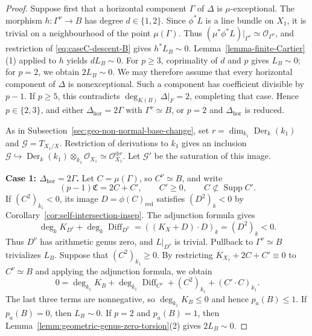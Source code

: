 \documentclass[10pt,abstract=true]{scrartcl}
\numberwithin{equation}{section}
\theoremstyle{definition}
\theoremstyle{remark}
\DeclareMathOperator\Supp{Supp}
\begin{document}
\begin{proof}
  Suppose first that a horizontal component $\Gamma$ of $\Delta$ is $\mu$-exceptional.
  The morphism $h\colon\Gamma^\nu\to B$ has degree $d\in\{1,2\}$.
  Since $\phi^*L$ is a line bundle on $X_1$, it is trivial on a neighbourhood of the point $\mu(\Gamma)$.
  Thus $(\mu^*\phi^*L)|_{\Gamma^\nu}\simeq\mathcal O_{\Gamma^\nu}$, and restriction of \eqref{eq:caseC-descent-B} gives $h^*L_B\sim0$.
  Lemma~\ref{lemma-finite-Cartier}\,\textup{(1)} applied to $h$ yields $dL_B\sim0$.
  For $p\geq3$, coprimality of $d$ and $p$ gives $L_B\sim0$; for $p=2$, we obtain $2L_B\sim0$.
  We may therefore assume that every horizontal component of $\Delta$ is nonexceptional.
  Such a component has coefficient divisible by $p-1$.
  If $p\geq5$, this contradicts $\deg_{K(B)}\Delta|_F=2$, completing that case.
  Hence $p\in\{2,3\}$, and either $\Delta_{\mathrm{hor}}=2\Gamma$ with $\Gamma^\nu\simeq B$, or $p=2$ and $\Delta_{\mathrm{hor}}$ is reduced.

  \smallskip
  As in Subsection~\ref{sec:geo-non-normal-base-change}, set $r=\dim_{k_1}\operatorname{Der}_k(k_1)$ and $\mathscr G=T_{X_1/X}$.
  Restriction of derivations to $k_1$ gives an inclusion $\mathscr G\hookrightarrow\operatorname{Der}_k(k_1)\otimes_{k_1}\mathcal O_{X_1} \simeq\mathcal O_{X_1}^{\oplus r}$.
  Let $\mathscr G'$ be the saturation of this image.

  \par\smallskip
  \noindent\textbf{Case 1: $\Delta_{\mathrm{hor}}=2\Gamma$.}
  Let $C=\mu(\Gamma)$, so $C^\nu\simeq B$, and write
  \[
    (p-1)\mathfrak C=2C+C',\qquad
    C'\geq0,\qquad C\not\subset\Supp C'.
  \]
  If $(C^2)_{k_1}<0$, its image $D=\phi(C)_{\mathrm{red}}$ satisfies $(D^2)_k<0$ by Corollary~\ref{cor:self-intersection-insep}.
  The adjunction formula gives
  \[
    \deg_kK_{D^\nu}+\deg_k\operatorname{Diff}_{D^\nu}
      =((K_X+D)\cdot D)_k=(D^2)_k<0.
  \]
  Thus $D^\nu$ has arithmetic genus zero, and $L|_{D^\nu}$ is trivial.
  Pullback to $\Gamma^\nu\simeq B$ trivializes $L_B$.
  Suppose that $(C^2)_{k_1}\geq0$.
  By restricting $K_{X_1}+2C+C'\equiv0$ to $C^\nu \simeq B$ and applying the adjunction formula, we obtain
  \begin{equation}\label{eq:caseC-adjunction}
       0=\deg_{k_1}K_B+\deg_{k_1}\operatorname{Diff}_{C^\nu}+(C^2)_{k_1}+(C'\cdot C)_{k_1}.
  \end{equation}
  The last three terms are nonnegative, so $\deg_{k_1}K_B\leq0$ and hence $p_a(B)\leq1$.
  If $p_a(B)=0$, then $L_B\sim0$.
  If $p=2$ and $p_a(B)=1$, then Lemma~\ref{lemm:geometric-genus-zero-torsion}\textup{(2)} gives $2L_B\sim0$.


\end{proof}
\end{document}
